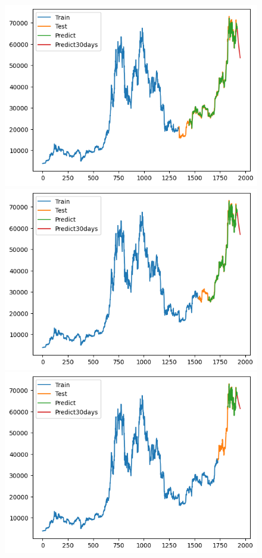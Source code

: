 \documentclass[conference]{IEEEtran}
\begin{document}
	\begin{figure}[H]
		\centering
		\begin{minipage}{0.15\textwidth}
			\centering
			\includegraphics[width=1\textwidth]{Figure/GRU_BTC_73.png}
		\end{minipage}
		\hfill
		\begin{minipage}{0.15\textwidth}
			\centering
			\includegraphics[width=1\textwidth]{Figure/GRU_BTC_82.png}
		\end{minipage}
		\hfill
		\begin{minipage}{0.15\textwidth}
			\centering
			\includegraphics[width=1\textwidth]{Figure/GRU_BTC_91.png}

\end{minipage}
\end{figure}
\end{document}
